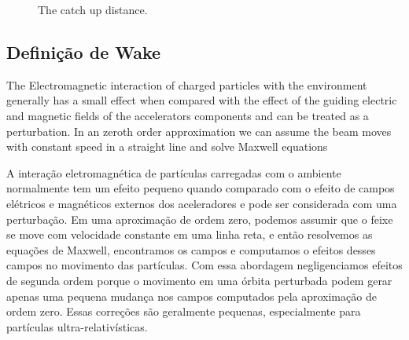 \documentclass[
	12pt,				%
	openright,			%
	oneside,			%
	a4paper,		%
	chapter=TITLE,		%
	section=TITLE,		%
    brazil,				%
	english,			%
	sumario=tradicional,
	]{abntex2}
\begin{document}
\begin{figure}[hb!]
\centering
\label{fig:catch_up}
\caption{The catch up distance.}
\end{figure}


\subsection{Definição de Wake}\label{ssec:wake_definition}

The Electromagnetic interaction of charged particles with the environment generally has a small effect when compared with the effect of the guiding electric and magnetic fields of the accelerators components and can be treated as a perturbation. In an zeroth order approximation we can assume the beam moves with constant speed in a straight line and solve Maxwell equations

A interação eletromagnética de partículas carregadas com o ambiente normalmente tem um efeito pequeno quando comparado com o efeito de campos elétricos e magnéticos externos dos aceleradores e pode ser considerada com uma perturbação. Em uma aproximação de ordem zero, podemos assumir que o feixe se move com velocidade constante em uma linha reta, e então resolvemos as equações de Maxwell, encontramos os campos e computamos o efeitos desses campos no movimento das partículas. Com essa abordagem negligenciamos efeitos de segunda ordem porque o movimento em uma órbita perturbada podem gerar apenas uma pequena mudança nos campos computados pela aproximação de ordem zero. Essas correções são geralmente pequenas, especialmente para partículas ultra-relativísticas.
\end{document}
